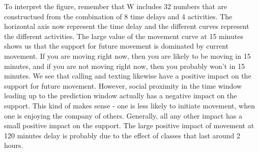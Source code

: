\documentclass[a4paper,10pt, landscape]{article}
\begin{document}
    To interpret the figure, remember that W includes 32 numbers that are
constructued from the combination of 8 time delays and 4 activities. The
horizontal axis now represent the time delay and the different curves
represent the different activities. The large value of the movement
curve at 15 minutes shows us that the support for future movement is
dominated by current movement. If you are moving right now, then you are
likely to be moving in 15 minutes, and if you are not moving right now,
then you probably won't in 15 minutes. We see that calling and texting
likewise have a positive impact on the support for future movement.
However, social proximity in the time window leading up to the
prediction window actually has a negative impact on the support. This
kind of makes sense - one is less likely to initiate movement, when one
is enjoying the company of others. Generally, all any other impact has a
small positive impact on the support. The large positive impact of
movement at 120 minutes delay is probably due to the effect of classes
that last around 2 hours.





    
\end{document}
